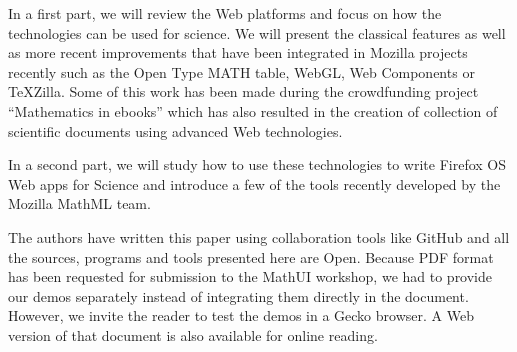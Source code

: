 In a first part, we will review the Web platforms and focus on how the
technologies can be used for science. We will present the classical features
as well as more recent improvements that have been integrated in Mozilla
projects recently such as the Open Type MATH table, WebGL, Web Components or
TeXZilla. Some of this work has been made during the crowdfunding project
``Mathematics in ebooks'' which has also resulted in the creation of collection
of scientific documents using advanced Web technologies.

In a second
part, we will study how to use these technologies to write Firefox OS Web apps
for Science and introduce a few of the tools recently developed by the Mozilla
MathML team.

The authors have written this paper using collaboration tools like GitHub and
all the sources, programs and tools presented here are Open. Because PDF format
has been requested for submission to the MathUI workshop, we had to provide
our demos separately instead of integrating them directly in the document.
However, we invite the reader to test the demos in a Gecko browser. A Web
version of that document is also available for online reading.

